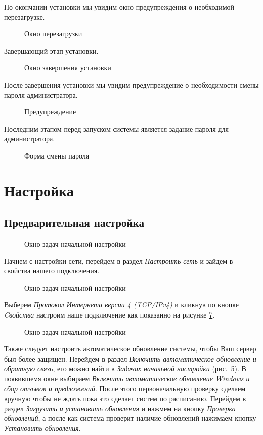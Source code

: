 \clearpage
По окончании установки мы увидим окно предупреждения о необходимой перезагрузке.
\begin{figure}[H]
\caption{Окно перезагрузки}
\label{igas8}
\end{figure}
\clearpage
Завершающий этап установки.
\begin{figure}[H]
\caption{Окно завершения установки}
\label{igas9}
\end{figure}
\clearpage
После завершения установки мы увидим предупреждение о необходимости смены пароля администратора.
\begin{figure}[H]
\caption{Предупреждение}
\label{igas10}
\end{figure}
\clearpage
Последним этапом перед запуском системы является задание пароля для администратора.
\begin{figure}[H]
\caption{Форма смены пароля}
\label{igas11}
\end{figure}

\section{Настройка}
\subsection{Предварительная настройка}
\begin{figure}[H]
\caption{Окно задач начальной настройки}
\label{igas12}
\end{figure}
\newpage
Начнем с настройки сети, перейдем в раздел \textit{Настроить сеть} и зайдем в свойства нашего подключения.
\begin{figure}[H]
\caption{Окно задач начальной настройки}
\label{igas13}
\end{figure}
Выберем \textit{Протокол Интернета версии 4 (TCP/IPv4)} и кликнув по кнопке \textit{Cвойства} настроим наше подключение как показанно на рисунке \ref{igas14}.
\begin{figure}[H]
\caption{Окно задач начальной настройки}
\label{igas14}
\end{figure}
Также следует настроить автоматическое обновление системы, чтобы Ваш сервер был более защищен. Перейдем в раздел \textit{Включить автоматическое обновление и обратную связь}, его можно найти в \textit{Задачах начальной настройки} (рис.~\ref{igas12}). В появившемя окне выбираем \textit{Включить автоматическое обновление Windows и сбор отзывов и предложений}. После этого первоначальную проверку сделаем вручную чтобы не ждать пока это сделает систем по расписанию. Перейдем в раздел \textit{Загрузить и установить обновления} и нажмем на кнопку \textit{Проверка обновлений}, а после как система проверит наличие обновлений нажимаем кнопку \textit{Установить обновления}.
